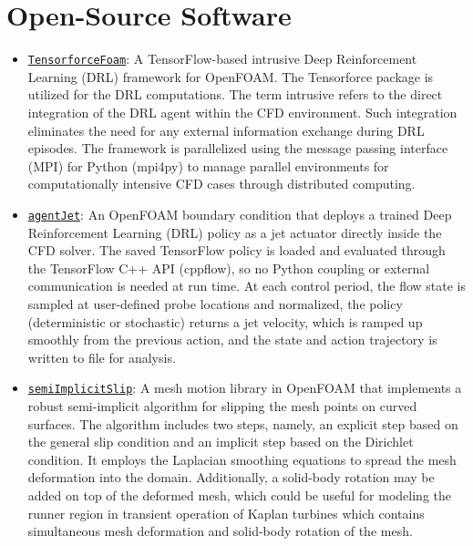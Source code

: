 \section{Open-Source Software}

\begin{itemize}[]
    \item \href{https://github.com/salehisaeed/TensorforceFoam}{\texttt{TensorforceFoam}}: A TensorFlow-based intrusive Deep Reinforcement Learning (DRL) framework for OpenFOAM. The Tensorforce package is utilized for the DRL computations. The term intrusive refers to the direct integration of the DRL agent within the CFD environment. Such integration eliminates the need for any external information exchange during DRL episodes. The framework is parallelized using the message passing interface (MPI) for Python (mpi4py) to manage parallel environments for computationally intensive CFD cases through distributed computing.

    \item \href{https://github.com/salehisaeed/agentJet}{\texttt{agentJet}}: An OpenFOAM boundary condition that deploys a trained Deep Reinforcement Learning (DRL) policy as a jet actuator directly inside the CFD solver. The saved TensorFlow policy is loaded and evaluated through the TensorFlow C++ API (cppflow), so no Python coupling or external communication is needed at run time. At each control period, the flow state is sampled at user-defined probe locations and normalized, the policy (deterministic or stochastic) returns a jet velocity, which is ramped up smoothly from the previous action, and the state and action trajectory is written to file for analysis.

    \item \href{https://github.com/salehisaeed/semiImplicitSlip}{\texttt{semiImplicitSlip}}: A mesh motion library in OpenFOAM that implements a robust semi-implicit algorithm for slipping the mesh points on curved surfaces. The algorithm includes two steps, namely, an explicit step based on the general slip condition and an implicit step based on the Dirichlet condition. It employs the Laplacian smoothing equations to spread the mesh deformation into the domain. Additionally, a solid-body rotation may be added on top of the deformed mesh, which could be useful for modeling the runner region in transient operation of Kaplan turbines which contains simultaneous mesh deformation and solid-body rotation of the mesh.


\end{itemize}
